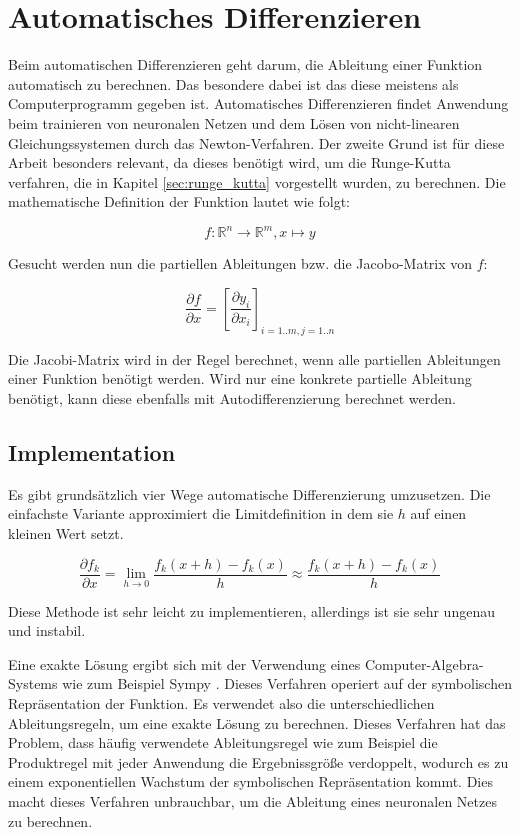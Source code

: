 
\section{Automatisches Differenzieren} \label{sec:auto_diffentiation}

Beim automatischen Differenzieren \cite{autodiff} geht darum, die Ableitung einer Funktion automatisch zu berechnen.
Das besondere dabei ist das diese meistens als Computerprogramm gegeben ist.
Automatisches Differenzieren findet Anwendung beim trainieren von neuronalen Netzen 
und dem Lösen von nicht-linearen Gleichungssystemen durch das Newton-Verfahren.
Der zweite Grund ist für diese Arbeit besonders relevant, da 
dieses benötigt wird, um die Runge-Kutta verfahren, die in Kapitel \ref{sec:runge_kutta} vorgestellt wurden, zu berechnen.
Die mathematische Definition der Funktion lautet wie folgt:

$$
f: \mathbb{R}^n \rightarrow \mathbb{R}^m, x \mapsto y
$$

Gesucht werden nun die partiellen Ableitungen bzw. die Jacobo-Matrix von $f$:

$$
\frac{\partial f}{\partial x} = \left[ \frac{\partial y_i}{\partial x_i} \right]_{i=1..m, j=1..n} 
$$

Die Jacobi-Matrix wird in der Regel berechnet, wenn alle partiellen Ableitungen einer Funktion benötigt werden.
Wird nur eine konkrete partielle Ableitung benötigt, kann diese ebenfalls mit Autodifferenzierung berechnet werden.

\subsection{Implementation} \label{sec:implementation}

Es gibt grundsätzlich vier Wege automatische Differenzierung umzusetzen.
Die einfachste Variante approximiert die Limitdefinition in dem sie $h$ auf einen kleinen Wert setzt.

$$
\frac{\partial f_k}{\partial x} = \lim_{h \to 0} \frac{f_k(x+ h) - f_k(x)}{h} \approx \frac{f_k(x + h) - f_k(x)}{h} 
$$

Diese Methode ist sehr leicht zu implementieren, allerdings ist sie sehr ungenau und instabil.

Eine exakte Lösung ergibt sich mit der Verwendung eines Computer-Algebra-Systems wie zum Beispiel Sympy \cite{sympy}.
Dieses Verfahren operiert auf der symbolischen Repräsentation der Funktion.
Es verwendet also die unterschiedlichen Ableitungsregeln, um eine exakte Lösung zu berechnen.
Dieses Verfahren hat das Problem, dass häufig verwendete Ableitungsregel wie zum Beispiel die Produktregel
mit jeder Anwendung die Ergebnissgröße verdoppelt, wodurch es zu einem exponentiellen Wachstum 
der symbolischen Repräsentation kommt.
Dies macht dieses Verfahren unbrauchbar, um die Ableitung eines neuronalen Netzes zu berechnen.


